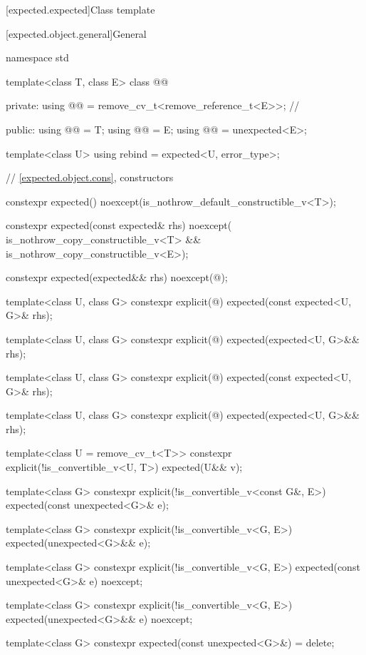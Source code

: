 [expected.expected]{Class template }

[expected.object.general]{General}

\begin{codeblock}
namespace std {
  template<class T, class E>
  class @@ {
  private:
    using @@ = remove_cv_t<remove_reference_t<E>>; // \expos

  public:
    using @@ = T;
    using @@ = E;
    using @@ = unexpected<E>;

    template<class U> using rebind = expected<U, error_type>;

    // \ref{expected.object.cons}, constructors

    constexpr expected() noexcept(is_nothrow_default_constructible_v<T>);

    constexpr expected(const expected& rhs) noexcept(
        is_nothrow_copy_constructible_v<T> && is_nothrow_copy_constructible_v<E>);

    constexpr expected(expected&& rhs) noexcept(@\seebelow@);

    template<class U, class G>
    constexpr explicit(@\seebelow@) expected(const expected<U, G>& rhs);

    template<class U, class G>
    constexpr explicit(@\seebelow@) expected(expected<U, G>&& rhs);

    template<class U, class G>
    constexpr explicit(@\seebelow@) expected(const expected<U, G>& rhs);

    template<class U, class G>
    constexpr explicit(@\seebelow@) expected(expected<U, G>&& rhs);

    template<class U = remove_cv_t<T>>
    constexpr explicit(!is_convertible_v<U, T>) expected(U&& v);

    template<class G>
    constexpr explicit(!is_convertible_v<const G&, E>) expected(const unexpected<G>& e);

    template<class G>
    constexpr explicit(!is_convertible_v<G, E>) expected(unexpected<G>&& e);

    template<class G>
    constexpr explicit(!is_convertible_v<G, E>)
        expected(const unexpected<G>& e) noexcept;

    template<class G>
    constexpr explicit(!is_convertible_v<G, E>) expected(unexpected<G>&& e) noexcept;

    template<class G> constexpr expected(const unexpected<G>&) = delete;

}}
\end{codeblock}
